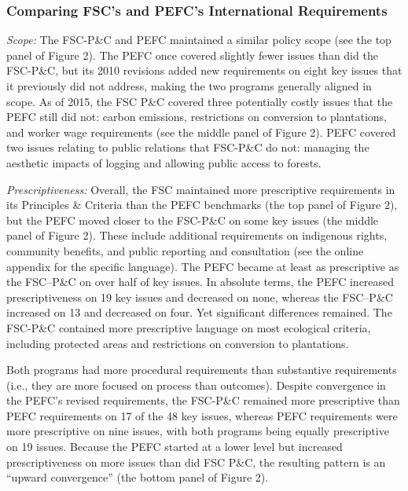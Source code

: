 \documentclass[
      12pt,
            Review ]{article}
\begin{document}
\hypertarget{comparing-fscs-and-pefcs-international-requirements}{%
\subsubsection{Comparing FSC's and PEFC's International Requirements}\label{comparing-fscs-and-pefcs-international-requirements}}

\emph{Scope:} The FSC-P\&C and PEFC maintained a similar policy scope (see the top panel of Figure 2). The PEFC once covered slightly fewer issues than did the FSC-P\&C, but its 2010 revisions added new requirements on eight key issues that it previously did not address, making the two programs generally aligned in scope. As of 2015, the FSC P\&C covered three potentially costly issues that the PEFC still did not: carbon emissions, restrictions on conversion to plantations, and worker wage requirements (see the middle panel of Figure 2). PEFC covered two issues relating to public relations that FSC-P\&C do not: managing the aesthetic impacts of logging and allowing public access to forests.

\emph{Prescriptiveness:} Overall, the FSC maintained more prescriptive requirements in its Principles \& Criteria than the PEFC benchmarks (the top panel of Figure 2), but the PEFC moved closer to the FSC-P\&C on some key issues (the middle panel of Figure 2). These include additional requirements on indigenous rights, community benefits, and public reporting and consultation (see the online appendix for the specific language). The PEFC became at least as prescriptive as the FSC--P\&C on over half of key issues. In absolute terms, the PEFC increased prescriptiveness on 19 key issues and decreased on none, whereas the FSC--P\&C increased on 13 and decreased on four. Yet significant differences remained. The FSC-P\&C contained more prescriptive language on most ecological criteria, including protected areas and restrictions on conversion to plantations.

Both programs had more procedural requirements than substantive requirements (i.e., they are more focused on process than outcomes). Despite convergence in the PEFC's revised requirements, the FSC-P\&C remained more prescriptive than PEFC requirements on 17 of the 48 key issues, whereas PEFC requirements were more prescriptive on nine issues, with both programs being equally prescriptive on 19 issues. Because the PEFC started at a lower level but increased prescriptiveness on more issues than did FSC P\&C, the resulting pattern is an ``upward convergence'' (the bottom panel of Figure 2).
\end{document}
